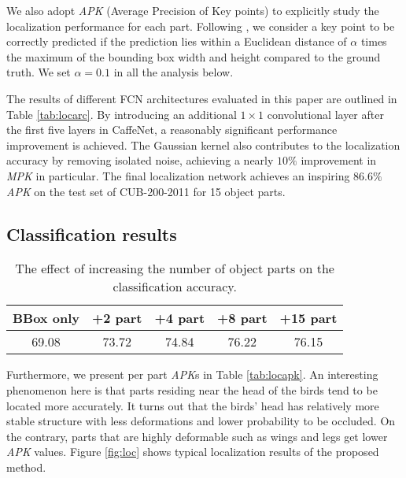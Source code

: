\documentclass[10pt,twocolumn,letterpaper]{article}
\begin{document}
We also adopt \emph{APK} (Average Precision of Key points) \cite{yang2013articulated} to explicitly study the localization performance for each part.
Following \cite{long2014convnets}, we consider a key point to be correctly predicted if the prediction lies within a Euclidean distance of $\alpha$ times
the maximum of the bounding box width and height compared to the ground truth.
We set $\alpha=0.1$ in all the analysis below.

The results of different FCN architectures evaluated in this paper are outlined in Table \ref{tab:locarc}. By introducing an additional $1\times1$ convolutional layer after the first five layers in CaffeNet, a reasonably significant performance improvement is achieved. The Gaussian kernel also contributes to the localization accuracy by removing isolated noise, achieving a nearly $10\%$ improvement in \emph{MPK} in particular. The final localization network achieves an inspiring $86.6\%$ \emph{APK} on the test set of CUB-200-2011 for 15 object parts.







\subsection{Classification results}
\begin{table}[t]
\small
\begin{center}
\begin{tabular}{c|c|c|c|c}
\hline
BBox only & +2 part & +4 part & +8 part & +15 part\\
\hline
69.08 & 73.72 & 74.84 & 76.22 & 76.15\\
\hline
\end{tabular}
\end{center}
\caption{The effect of increasing the number of object parts on the classification accuracy.}
\label{tab:increm}
\end{table}



Furthermore, we present per part \emph{APK}s in Table \ref{tab:locapk}. An interesting phenomenon here is that parts residing near the head of the birds tend to be located more accurately. It turns out that the birds' head has relatively more stable structure with less deformations and lower probability to be occluded. On the contrary, parts that are highly deformable such as wings and legs get lower \emph{APK} values. Figure \ref{fig:loc} shows typical localization results of the proposed method.
\end{document}
